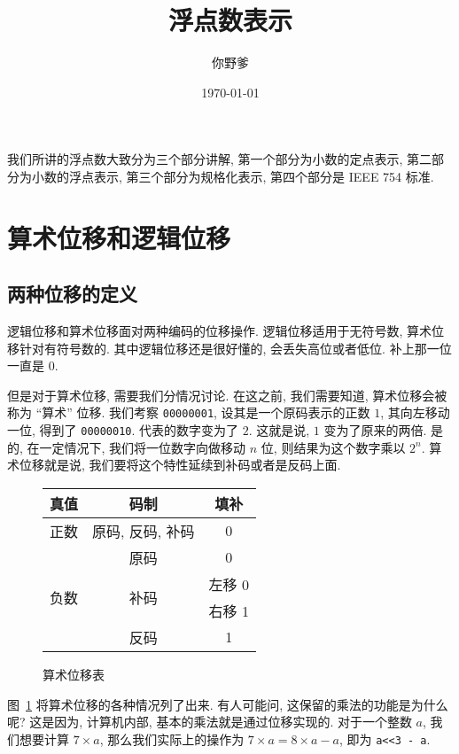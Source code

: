 \documentclass[12pt]{ctexart}
\theoremstyle{definition}
\theoremstyle{plain}
\begin{document}
\title{浮点数表示}
\author{你野爹}
\date{\today}
\maketitle
\tableofcontents

我们所讲的浮点数大致分为三个部分讲解, 第一个部分为小数的定点表示, 第二部分为小数的浮点表示, 第三个部分为规格化表示, 第四个部分是 IEEE 754 标准. 

\section{算术位移和逻辑位移}
\subsection{两种位移的定义}
逻辑位移和算术位移面对两种编码的位移操作. 逻辑位移适用于无符号数, 算术位移针对有符号数的. 其中逻辑位移还是很好懂的, 会丢失高位或者低位. 补上那一位一直是 \(0\). 

但是对于算术位移, 需要我们分情况讨论. 在这之前, 我们需要知道, 算术位移会被称为 ``算术'' 位移. 我们考察 \texttt{00000001}, 设其是一个原码表示的正数 \(1\), 其向左移动一位, 得到了 \texttt{00000010}. 代表的数字变为了 \(2\). 这就是说, \(1\) 变为了原来的两倍. 是的, 在一定情况下, 我们将一位数字向做移动 \(n\) 位, 则结果为这个数字乘以 \(2 ^{n}\). 算术位移就是说, 我们要将这个特性延续到补码或者是反码上面. 

\begin{figure}
\centering
\begin{tabular}{|l|c|c|}
\hline
真值                  & 码制                  & 填补                        \\ \hline
正数                  & 原码, 反码, 补码          & 0                       \\ \hline
\multirow{4}{*}{负数} & 原码                  & 0						   	\\ \cline{2-3}
                    & \multirow{2}{*}{补码} & 左移 0                      	\\ \cline{3-3}
                    &                     & \multicolumn{1}{l|}{右移 1} 	\\ \cline{2-3}
                    & 反码                  & 1                         	\\ \hline
\end{tabular}
\caption{算术位移表}\label{tab:suan}
\end{figure}

图~\ref{tab:suan} 将算术位移的各种情况列了出来. 有人可能问, 这保留的乘法的功能是为什么呢? 这是因为, 计算机内部, 基本的乘法就是通过位移实现的. 对于一个整数 \(a\), 我们想要计算 \(7 \times a\), 那么我们实际上的操作为 \(7 \times a =  8 \times a - a \), 即为 \texttt{a<<3 - a}. 
\end{document}
